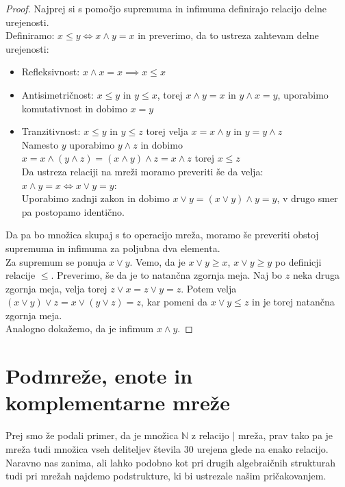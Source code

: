 \documentclass[a4paper]{article}
\begin{document}
\begin{proof}
Najprej si s pomočjo supremuma in infimuma definirajo relacijo delne urejenosti.\\
Definiramo: $x \leq y \iff x \land y = x$ in preverimo, da to ustreza zahtevam delne urejenosti:
\begin{itemize}
\item Refleksivnost: $x \land x = x \implies x \leq x$
\item Antisimetričnost: $x \leq y$ in $y \leq x$, torej $x \land y = x$ in $y \land x = y$, uporabimo komutativnost in dobimo $x = y$
\item Tranzitivnost: $x \leq y$ in $y \leq z$ torej velja $x = x \land y$ in $y = y \land z$ \\ Namesto $y$ uporabimo $y \land z$ in dobimo $x = x \land (y \land z) = (x \land y) \land z = x \land z$ torej  $x \leq z$\\
Da ustreza relaciji na mreži moramo preveriti še da velja: $x \land y = x \iff x \lor y = y$:\\ 
Uporabimo zadnji zakon in dobimo $x \lor y = (x \lor y) \land y = y$, v drugo smer pa postopamo identično.
\end{itemize}

Da pa bo množica skupaj s to operacijo mreža, moramo še preveriti obstoj supremuma in infimuma za poljubna dva elementa. \\
Za supremum se ponuja $x \lor y$. Vemo, da je $x \lor y \geq x$, $x \lor y \geq y$ po definicji relacije $\leq$. Preverimo, še da je to natančna zgornja meja. Naj bo $z$ neka druga zgornja meja, velja torej $z \lor x = z \lor y = z$. Potem velja $(x \lor y) \lor z = x \lor (y \lor z) = z$, kar pomeni da $x \lor y \leq z$ in je torej natančna zgornja meja.\\
Analogno dokažemo, da je infimum $x \land y$. 

\end{proof}

\section{Podmreže, enote in komplementarne mreže}

Prej smo že podali primer, da je množica $\mathbb{N}$ z relacijo $\mid$ mreža, prav tako pa je mreža tudi množica vseh deliteljev števila $30$ urejena glede na enako relacijo. Naravno nas zanima, ali lahko podobno kot pri drugih algebraičnih strukturah tudi pri mrežah najdemo podstrukture, ki bi ustrezale našim pričakovanjem.
\end{document}
